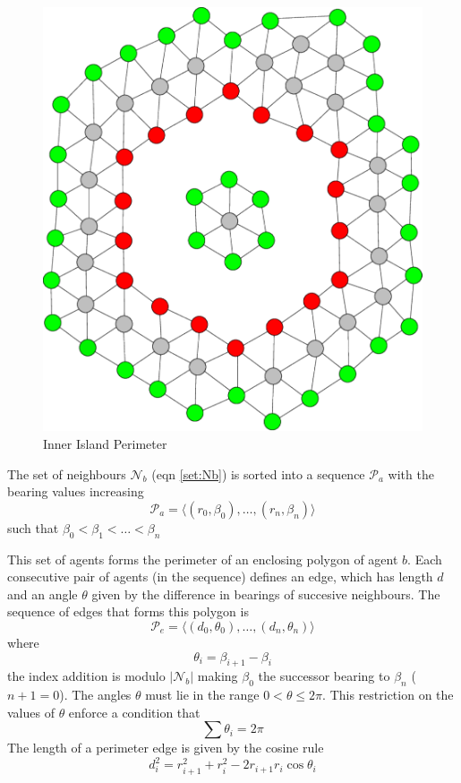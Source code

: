\documentclass[preprint,12pt]{elsarticle}
\begin{document}
\begin{figure}
\begin{center}
\includegraphics{figures/PerimeterBots2}
\end{center}
\caption{Inner Island Perimeter\label{fig:PerimeterBots2}}
\end{figure}

The set of neighbours $\mathcal N_b$ (eqn \ref{set:Nb}) is sorted into a
sequence $\mathcal P_a$ with the bearing values
increasing
\begin{equation}
	\mathcal P_a = \langle (r_0,\beta_0),\ldots,(r_n,\beta_n) \rangle
\end{equation}
such that $\beta_0 < \beta_1 < \ldots < \beta_n$

This set of agents forms the perimeter of an enclosing polygon of agent $b$. 
Each consecutive pair of agents (in the sequence) defines an edge, which has
length $d$ and an angle $\theta$ given by the difference in bearings of
succesive neighbours.  The sequence of edges
that forms this polygon is
\begin{equation}
	\mathcal{P}_e = \langle (d_0,\theta_0), \ldots , (d_n,\theta_n) \rangle
\end{equation}
where
\begin{equation}
	\theta_i = \beta_{i+1} - \beta_i
\end{equation}
the index addition is modulo $|\mathcal N_b|$ making $\beta_0$ the successor
bearing to $\beta_n$ ($n+1 = 0$).  The angles $\theta$ must lie in the range
$0<\theta\leq2\pi$.
This restriction on the values of $\theta$ enforce a condition that
\begin{equation}
	\sum\theta_i = 2\pi
\end{equation}
The length of a perimeter edge is given by the cosine rule
\begin{equation}
	d_i^2 = r_{i+1}^2 + r_i^2 -2r_{i+1}r_i \cos\theta_i
\end{equation}
\end{document}
